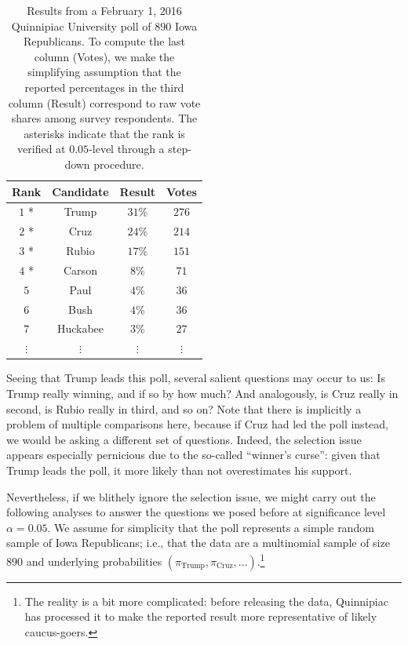\documentclass[11pt]{article}
\theoremstyle{definition}
\theoremstyle{custom}
\begin{document}
\begin{table}[htbp]
\begin{center}
\begin{tabular}{c c c c}
	\hline
	Rank & Candidate & Result & Votes \\
	\hline
	$1$ * & Trump & $31\%$ & $276$ \\
	$2$ * & Cruz & $24\%$ & $214$ \\
	$3$ * & Rubio & $17\%$ & $151$ \\
	$4$ * & Carson & $8\%$ & $71$ \\
	$5$ & Paul & $4\%$ & $36$ \\
	$6$ & Bush & $4\%$ & $36$ \\
	$7$ & Huckabee & $3\%$ & $27$ \\
	$\vdots$ & $\vdots$ & $\vdots $ & $\vdots$ \\
	\hline
\end{tabular}
\end{center}
\caption{Results from a February 1, 2016 Quinnipiac University poll of $890$ Iowa Republicans. To compute the last column (Votes), we make the simplifying assumption that the reported percentages in the third column (Result) correspond to raw vote shares among survey respondents. The asterisks indicate that the rank is verified at $0.05$-level through a step-down procedure.}
\label{tbl:poll}
\end{table}

Seeing that Trump leads this poll, several salient questions may occur to us: Is Trump really winning, and if so by how much? And analogously, is Cruz really in second, is Rubio really in third, and so on? Note that there is implicitly a problem of multiple comparisons here, because if Cruz had led the poll instead, we would be asking a different set of questions. Indeed, the selection issue appears especially pernicious due to the so-called ``winner's curse'': given that Trump leads the poll, it more likely than not overestimates his support.

Nevertheless, if we blithely ignore the selection issue, we might carry out the following analyses to answer the questions we posed before at significance level $\alpha = 0.05$. We assume for simplicity that the poll represents a simple random sample of Iowa Republicans; i.e., that the data are a multinomial sample of size $890$ and underlying probabilities $\left(\pi_{\text{Trump}}, \pi_{\text{Cruz}}, \ldots\right)$.\footnote{The reality is a bit more complicated: before releasing the data, Quinnipiac has processed it to make the reported result more representative of likely caucus-goers.}
\end{document}
